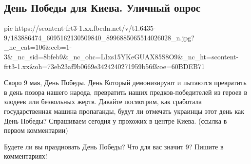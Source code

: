  
 
 
 
 
\subsection{День Победы для Киева. Уличный опрос}
\label{sec:08_05_2021.fb.zharkih_ekaterina.1.kiev_den_pobedy}


\ifcmt
  pic https://scontent-frt3-1.xx.fbcdn.net/v/t1.6435-9/183886474_6095162130509840_8996885065514026028_n.jpg?_nc_cat=106&ccb=1-3&_nc_sid=8bfeb9&_nc_ohc=LIxs15YKeGUAX85S8O9&_nc_ht=scontent-frt3-1.xx&oh=73eb23af9b0669e3424240271959b56f&oe=60BDEB71
\fi


Скоро 9 мая, День Победы. День Который демонизируют и пытаются превратить в
день позора нашего народа, превратить наших предков-победителей из героев в
злодеев или безвольных жертв. Давайте посмотрим, как сработала государственная
машина пропаганды, будут ли отмечать украинцы этот день как День Победы?
Спрашиваем сегодня у прохожих в центре Киева.  (ссылка в первом комментарии)

Будете ли вы праздновать День Победы? Что для вас значит 9? Пишите в
комментариях!
